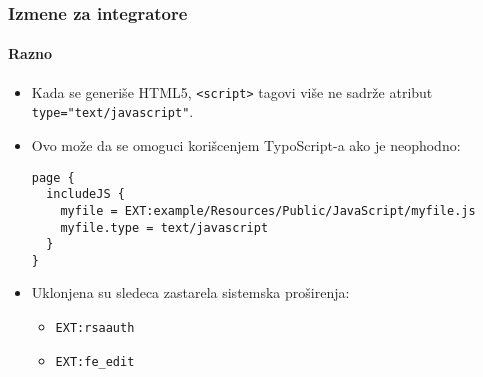\begin{frame}[fragile]
	\frametitle{Izmene za integratore}
	\framesubtitle{Razno}

	\lstset{basicstyle=\tiny\ttfamily}

	\begin{itemize}

		\item Kada se generiše HTML5, \texttt{<script>} tagovi više ne sadrže atribut
			\texttt{type="text/javascript"}.

		\item Ovo može da se omoguci korišcenjem TypoScript-a ako je neophodno:

\begin{lstlisting}
page {
  includeJS {
    myfile = EXT:example/Resources/Public/JavaScript/myfile.js
    myfile.type = text/javascript
  }
}
\end{lstlisting}

		\item Uklonjena su sledeca zastarela sistemska proširenja:

			\begin{itemize}
				\item \texttt{EXT:rsaauth}
				\item \texttt{EXT:fe\_edit}
			\end{itemize}

	\end{itemize}

\end{frame}

